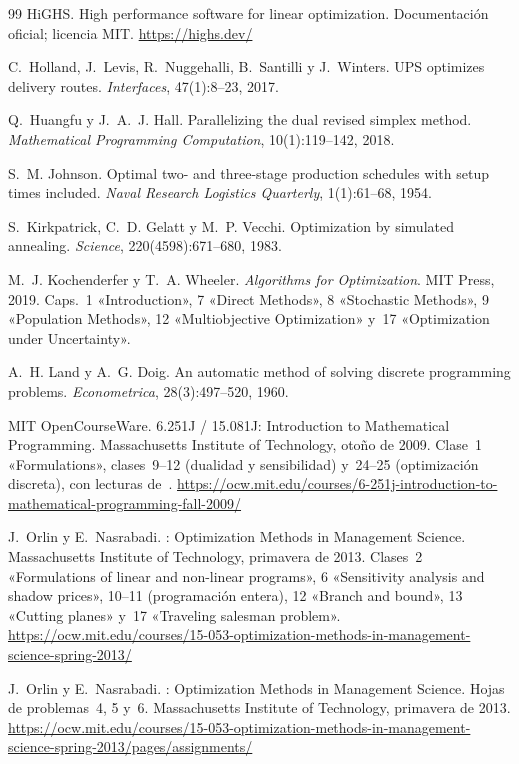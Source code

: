 \begin{thebibliography}{99}
HiGHS.
\newblock High performance software for linear optimization.
\newblock Documentación oficial; licencia MIT.
\newblock \url{https://highs.dev/}

C.~Holland, J.~Levis, R.~Nuggehalli, B.~Santilli y J.~Winters.
\newblock UPS optimizes delivery routes.
\newblock \emph{Interfaces}, 47(1):8--23, 2017.

Q.~Huangfu y J.~A.~J. Hall.
\newblock Parallelizing the dual revised simplex method.
\newblock \emph{Mathematical Programming Computation}, 10(1):119--142, 2018.

S.~M. Johnson.
\newblock Optimal two- and three-stage production schedules with setup times included.
\newblock \emph{Naval Research Logistics Quarterly}, 1(1):61--68, 1954.

S.~Kirkpatrick, C.~D. Gelatt y M.~P. Vecchi.
\newblock Optimization by simulated annealing.
\newblock \emph{Science}, 220(4598):671--680, 1983.

M.~J. Kochenderfer y T.~A. Wheeler.
\newblock \emph{Algorithms for Optimization}.
\newblock MIT Press, 2019. Caps.~1 «Introduction», 7 «Direct Methods», 8 «Stochastic Methods», 9 «Population Methods», 12 «Multiobjective Optimization» y~17 «Optimization under Uncertainty».

A.~H. Land y A.~G. Doig.
\newblock An automatic method of solving discrete programming problems.
\newblock \emph{Econometrica}, 28(3):497--520, 1960.

MIT OpenCourseWare.
\newblock 6.251J / 15.081J: Introduction to Mathematical Programming.
\newblock Massachusetts Institute of Technology, otoño de 2009. Clase~1 «Formulations», clases~9--12 (dualidad y sensibilidad) y~24--25 (optimización discreta), con lecturas de~\cite{bt}.
\newblock \url{https://ocw.mit.edu/courses/6-251j-introduction-to-mathematical-programming-fall-2009/}

J.~Orlin y E.~Nasrabadi.
: Optimization Methods in Management Science.
\newblock Massachusetts Institute of Technology, primavera de 2013. Clases~2 «Formulations of linear and non-linear programs», 6 «Sensitivity analysis and shadow prices», 10--11 (programación entera), 12 «Branch and bound», 13 «Cutting planes» y~17 «Traveling salesman problem».
\newblock \url{https://ocw.mit.edu/courses/15-053-optimization-methods-in-management-science-spring-2013/}

J.~Orlin y E.~Nasrabadi.
: Optimization Methods in Management Science. Hojas de problemas~4, 5 y~6.
\newblock Massachusetts Institute of Technology, primavera de 2013.
\newblock \url{https://ocw.mit.edu/courses/15-053-optimization-methods-in-management-science-spring-2013/pages/assignments/}


\end{thebibliography}
